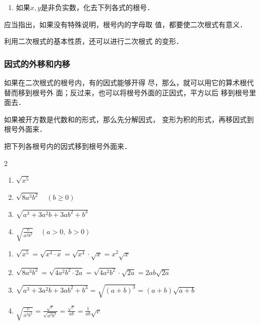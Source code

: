 \begin{ex}
\begin{enumerate}
\item 如果$x,y$是非负实数，化去下列各式的根号．
\begin{enumerate}
\end{enumerate}
\end{enumerate}
\end{ex}

应当指出，如果没有特殊说明，根号内的字母取
值，都要使二次根式有意义．

利用二次根式的基本性质，还可以进行二次根式
的变形．

\subsubsection{因式的外移和内移}
如果在二次根式的根号内，有的因式能够开得
尽，那么，就可以用它的算术根代替而移到根号外
面；反过来，也可以将根号外面的正因式，平方以后
移到根号里面去．

如果被开方数是代数和的形式，那么先分解因式，
变形为积的形式，再移因式到根号外面来．

\begin{example}
    把下列各根号内的因式移到根号外面来．
    \begin{multicols}{2}
     \begin{enumerate}
    \item $\sqrt{x^{5}}$
    \item $\sqrt{8 a^{3} b^{2}}\quad (b \ge 0)$
    \item $\sqrt{a^{3}+3 a^{2} b+3 a b^{2}+b^{3}}$
    \item $\sqrt{\frac{c}{a^{2} b^{2}}}\quad (a>0,\; b>0)$
\end{enumerate}   
    \end{multicols}

\end{example}


\begin{solution}
\begin{enumerate}
    \item $\sqrt{x^{5}}=\sqrt{x^{4} \cdot x}=\sqrt{x^{4}} \cdot \sqrt{x}=x^{2} \sqrt{x}$
    \item $\sqrt{8 a^{3} b^{2}}=\sqrt{4 a^{2} b^{2} \cdot 2 a}=\sqrt{4 a^{2} b^{2}} \cdot \sqrt{2 a}=2 {a} b \sqrt{2 a}$
    \item $\sqrt{a^{3}+3 a^{2} b+3 ab^{2}+b^{3}}=\sqrt{(a+b)^{3}}=(a+b) \sqrt{a+b}$
    \item $\sqrt{\frac{c}{a^{2} b^{2}}}=\frac{\sqrt{c}}{\sqrt{a^{2} b^{2}}}=\frac{\sqrt{c}}{a b}=\frac{1}{a b} \sqrt{c}$
\end{enumerate}
\end{solution}

